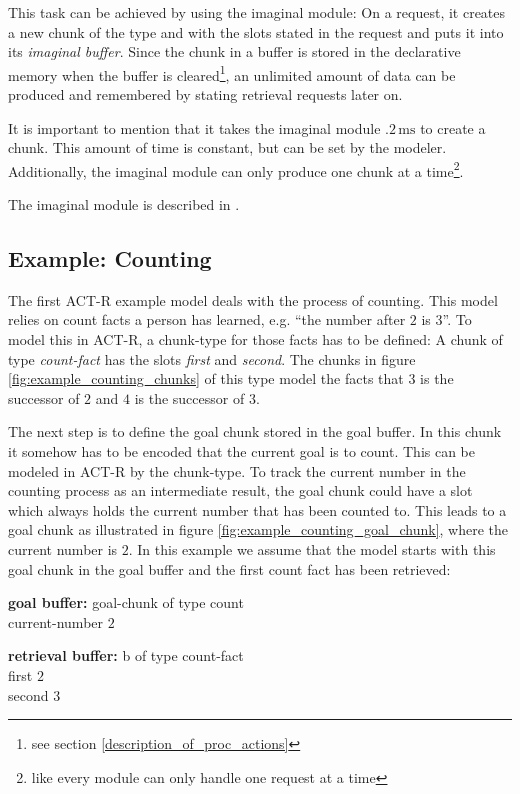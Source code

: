 This task can be achieved by using the imaginal module: On a request, it creates a new chunk of the type and with the slots stated in the request and puts it into its \emph{imaginal buffer}. Since the chunk in a buffer is stored in the declarative memory when the buffer is cleared\footnote{see section \ref{description_of_proc_actions}}, an unlimited amount of data can be produced and remembered by stating retrieval requests later on.

It is important to mention that it takes the imaginal module $.2\,\mathrm{ms}$ to create a chunk. This amount of time is constant, but can be set by the modeler. Additionally, the imaginal module can only produce one chunk at a time\footnote{like every module can only handle one request at a time}.

The imaginal module is described in \cite[unit 2]{actr_tutorial}.

\subsection{Example: Counting}
\label{example_counting}

The first ACT-R example model deals with the process of counting. This model relies on count facts a person has learned, e.g. ``the number after $2$ is $3$''. To model this in ACT-R, a chunk-type for those facts has to be defined: A chunk of type \emph{count-fact} has the slots \emph{first} and \emph{second}. The chunks in figure \ref{fig:example_counting_chunks} of this type model the facts that $3$ is the successor of $2$ and $4$ is the successor of $3$.

The next step is to define the goal chunk stored in the goal buffer. In this chunk it somehow has to be encoded that the current goal is to count. This can be modeled in ACT-R by the chunk-type. To track the current number in the counting process as an intermediate result, the goal chunk could have a slot which always holds the current number that has been counted to. This leads to a goal chunk as illustrated in figure \ref{fig:example_counting_goal_chunk}, where the current number is $2$. In this example we assume that the model starts with this goal chunk in the goal buffer and the first count fact has been retrieved:

\parbox{100mm}{\textbf{goal buffer:} goal-chunk of type count\\
\noindent\hspace*{20mm} current-number $2$}

\parbox{100mm}{\textbf{retrieval buffer:} b of type count-fact\\
\noindent\hspace*{20mm} first $2$\\
\noindent\hspace*{20mm} second $3$}

